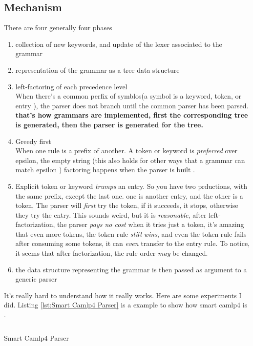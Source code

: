 \subsection{Mechanism}
  There are four generally four phases
  \begin{enumerate}[I]
  \item collection of new keywords, and update of the lexer associated
    to the grammar
  \item representation of the grammar as a tree data structure
  \item left-factoring of each precedence level \\
    When there's a common perfix of symblos(a symbol is a keyword,
    token, or entry ), the parser does not branch until the common parser
    has been parsed. \textbf{that's how grammars are implemented, first the
      corresponding tree is generated, then the parser is generated for
      the tree.}
  \item Greedy first \\
    When one rule is a prefix of another.  A token or keyword is
    \textit{preferred} over epsilon, the empty string (this also holds for
    other ways that a grammar can match epsilon ) factoring happens
    when the parser is built .
  \item Explicit token or keyword \textit{trumps} an entry. So you
    have two prductions, with the same prefix, except the last
    one. one is another entry, and the other is a token, The parser
    will \textit{first} try the token, if it succeeds, it stops,
    otherwise they try the entry. This sounds weird, but it is
    \textit{reasonable}, after left-factorization, the parser
    \textit{pays no cost} when it tries just a token, it's amazing
    that even more tokens, the token rule \textit{still wins}, and
    even the token rule fails after consuming some tokens, it can
    \textit{even} transfer to the entry rule.  To notice, it seems
    that after  factorization, the rule order \textit{may} be changed.
  \item the data structure representing the grammar is then passed as
    argument to a generic parser
  \end{enumerate}

  It's really hard to understand how it really works. Here are some
  experiments I did. Listing \ref{lst:Smart Camlp4 Parser} is a
  example to show how smart camlp4 is .
\begin{listing}
  \inputminted[fontsize=\scriptsize]{ocaml}{code/camlp4/parser_cases/second.ml}
  \caption{Smart Camlp4 Parser}
  \label{lst:Smart Camlp4 Parser}
\end{listing}


